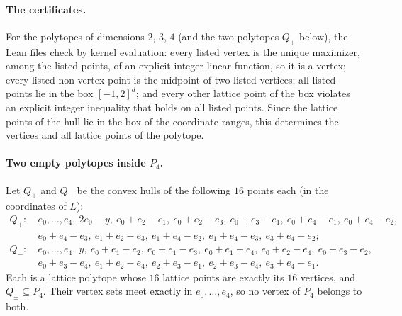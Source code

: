 \documentclass[11pt]{article}
\theoremstyle{definition}
\theoremstyle{remark}
\begin{document}
\paragraph{The certificates.} For the polytopes of dimensions $2$, $3$, $4$ (and
the two polytopes $Q_\pm$ below), the Lean files check by kernel evaluation:
every listed vertex is the unique maximizer, among the listed points, of an
explicit integer linear function, so it is a vertex; every listed non-vertex
point is the midpoint of two listed vertices; all listed points lie in the box
$[-1,2]^d$; and every other lattice point of the box violates an explicit
integer inequality that holds on all listed points. Since the lattice points of
the hull lie in the box of the coordinate ranges, this determines the vertices
and all lattice points of the polytope.

\paragraph{Two empty polytopes inside $P_4$.} Let $Q_+$ and $Q_-$ be the convex
hulls of the following $16$ points each (in the coordinates of $L$):
\begin{align*}
Q_+:\ & e_0,\dots,e_4,\ 2e_0-y,\ e_0+e_2-e_1,\ e_0+e_2-e_3,\ e_0+e_3-e_1,\ e_0+e_4-e_1,\ e_0+e_4-e_2,\\
& e_0+e_4-e_3,\ e_1+e_2-e_3,\ e_1+e_4-e_2,\ e_1+e_4-e_3,\ e_3+e_4-e_2;\\
Q_-:\ & e_0,\dots,e_4,\ y,\ e_0+e_1-e_2,\ e_0+e_1-e_3,\ e_0+e_1-e_4,\ e_0+e_2-e_4,\ e_0+e_3-e_2,\\
& e_0+e_3-e_4,\ e_1+e_2-e_4,\ e_2+e_3-e_1,\ e_2+e_3-e_4,\ e_3+e_4-e_1 .
\end{align*}
Each is a lattice polytope whose $16$ lattice points are exactly its $16$
vertices, and $Q_\pm\subseteq P_4$. Their vertex sets meet exactly in
$e_0,\dots,e_4$, so no vertex of $P_4$ belongs to both.
\end{document}
